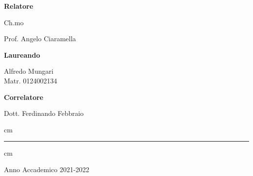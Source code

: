 \documentclass[12pt,a4paper,oneside,openright]{book}
\begin{document}
    \vskip 1.0cm

    \large
    \begin{minipage}[t]{7cm}
        \textbf{Relatore}

        Ch.mo 

        Prof. Angelo Ciaramella\\

    \end{minipage}
    \hfill
    \begin{minipage}[t]{5cm}
        \textbf{Laureando}

        Alfredo Mungari\\
        Matr. 0124002134
    \end{minipage}

    \large
    \begin{minipage}[t]{7cm}
        \textbf{Correlatore}

        Dott. Ferdinando Febbraio\\

    \end{minipage}

     cm

    \hrule
     cm \Large \centerline {Anno Accademico 2021-2022}
    \vfill \eject

    \pagestyle{plain}

    \tableofcontents

    \listoffigures

    \listoftables

    
    
    
    
    

    \printbibliography
\end{document}
